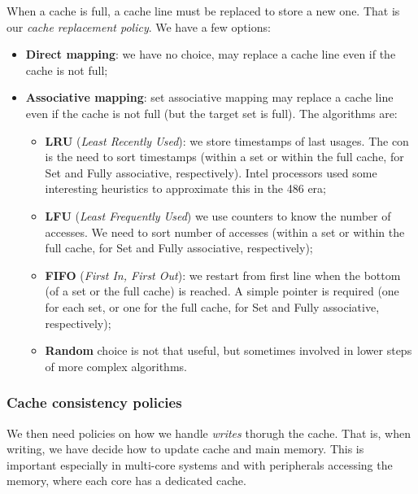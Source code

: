 \documentclass[a4paper,11pt]{article}
\begin{document}
When a cache is full, a cache line must be replaced to store a new one.
That is our \textit{cache replacement policy}.
We have a few options:
\begin{itemize}
	\item \textbf{Direct mapping}: we have no choice, may replace a cache line even if the cache is not full;
	\item \textbf{Associative mapping}: set associative mapping may replace a cache line even if the cache is not full (but the target set is full). The algorithms are:
	      \begin{itemize}
		      \item \textbf{LRU} (\textit{Least Recently Used}): we store timestamps of last usages. The con is the need to sort timestamps (within a set or within the full cache, for Set and Fully associative, respectively). Intel processors used some interesting heuristics to approximate this in the 486 era;

		      \item \textbf{LFU} (\textit{Least Frequently Used}) we use counters to know the number of accesses. We need to sort number of accesses (within a set or within the full cache, for Set and Fully associative, respectively);

		      \item \textbf{FIFO} (\textit{First In, First Out}): we restart from first line when the bottom (of a set or the full cache) is reached. A simple pointer is required (one for each set, or one for the full cache, for Set and Fully associative, respectively);

		      \item \textbf{Random} choice is not that useful, but sometimes involved in lower steps of more complex algorithms.
	      \end{itemize}

\end{itemize}

\subsubsection{Cache consistency policies}

We then need policies on how we handle \textit{writes} thorugh the cache.
That is, when writing, we have decide how to update cache and main memory.
This is important especially in multi-core systems and with peripherals accessing the memory, where each core has a dedicated cache.
\end{document}
